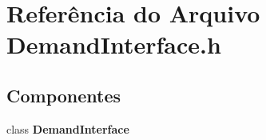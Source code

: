 \section{Referência do Arquivo Demand\+Interface.\+h}
\label{_demand_interface_8h}
\subsection*{Componentes}
\begin{DoxyCompactItemize}
\item 
class {\bf Demand\+Interface}
\end{DoxyCompactItemize}
